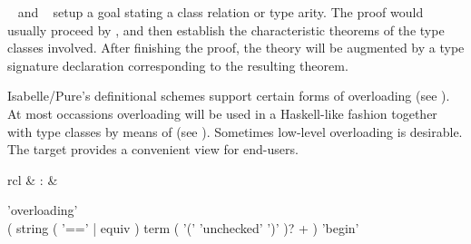 \begin{isabellebody}
\begin{isamarkuptext}
\begin{description}
  \item \hyperlink{command.instance}{\mbox{}}~ and \hyperlink{command.instance}{\mbox{}}~ setup a goal stating a class
  relation or type arity.  The proof would usually proceed by \hyperlink{method.intro-classes}{\mbox{}}, and then establish the characteristic theorems of
  the type classes involved.  After finishing the proof, the theory
  will be augmented by a type signature declaration corresponding to
  the resulting theorem.

  \end{description}%
\end{isamarkuptext}%
\isamarkuptrue%
%
\isamarkuptrue%
%
\begin{isamarkuptext}%
Isabelle/Pure's definitional schemes support certain forms of
  overloading (see ).  At most occassions
  overloading will be used in a Haskell-like fashion together with
  type classes by means of \hyperlink{command.instantiation}{\mbox{}} (see
  ).  Sometimes low-level overloading is desirable.
  The \hyperlink{command.overloading}{\mbox{}} target provides a convenient view for
  end-users.

  \begin{matharray}{rcl}
    \hypertarget{command.overloading}{\hyperlink{command.overloading}{\mbox{}}} & : &  \\
  \end{matharray}

  \begin{rail}
    'overloading' \\
    ( string ( '==' | equiv ) term ( '(' 'unchecked' ')' )? + ) 'begin'
  \end{rail}

  \begin{description}


\end{description}
\end{isamarkuptext}
\end{isabellebody}

